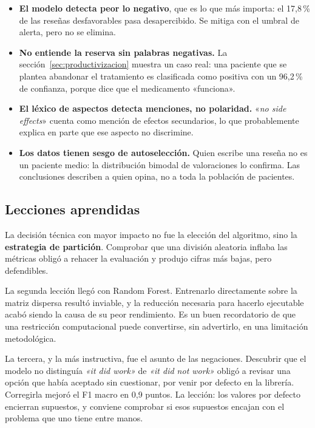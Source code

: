 \documentclass[11pt,a4paper]{article}
\begin{document}
\begin{itemize}[leftmargin=*]
  \item \textbf{El modelo detecta peor lo negativo}, que es lo que más importa:
        el 17,8\,\% de las reseñas desfavorables pasa desapercibido. Se mitiga
        con el umbral de alerta, pero no se elimina.
  \item \textbf{No entiende la reserva sin palabras negativas.} La
        sección~\ref{sec:productivizacion} muestra un caso real: una paciente
        que se plantea abandonar el tratamiento es clasificada como positiva con
        un 96,2\,\% de confianza, porque dice que el medicamento «funciona».
  \item \textbf{El léxico de aspectos detecta menciones, no polaridad.}
        «\textit{no side effects}» cuenta como mención de efectos secundarios, lo
        que probablemente explica en parte que ese aspecto no discrimine.
  \item \textbf{Los datos tienen sesgo de autoselección.} Quien escribe una
        reseña no es un paciente medio: la distribución bimodal de valoraciones
        lo confirma. Las conclusiones describen a quien opina, no a toda la
        población de pacientes.
\end{itemize}

\subsection{Lecciones aprendidas}

La decisión técnica con mayor impacto no fue la elección del algoritmo, sino la
\textbf{estrategia de partición}. Comprobar que una división aleatoria inflaba
las métricas obligó a rehacer la evaluación y produjo cifras más bajas, pero
defendibles.

La segunda lección llegó con Random Forest. Entrenarlo directamente sobre la
matriz dispersa resultó inviable, y la reducción necesaria para hacerlo
ejecutable acabó siendo la causa de su peor rendimiento. Es un buen recordatorio
de que una restricción computacional puede convertirse, sin advertirlo, en una
limitación metodológica.

La tercera, y la más instructiva, fue el asunto de las negaciones. Descubrir
que el modelo no distinguía \textit{«it did work»} de \textit{«it did not
work»} obligó a revisar una opción que había aceptado sin cuestionar, por venir
por defecto en la librería. Corregirla mejoró el F1 macro en 0,9 puntos. La
lección: los valores por defecto encierran supuestos, y conviene comprobar si
esos supuestos encajan con el problema que uno tiene entre manos.
\end{document}
